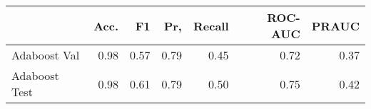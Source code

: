 \begin{tabular}{lrrrrrr}
\toprule
{} &  Acc. &    F1 &   Pr, &  Recall &  ROC-AUC &  PRAUC \\
\midrule
Adaboost Val  &  0.98 &  0.57 &  0.79 &    0.45 &     0.72 &   0.37 \\
Adaboost Test &  0.98 &  0.61 &  0.79 &    0.50 &     0.75 &   0.42 \\
\bottomrule
\end{tabular}
